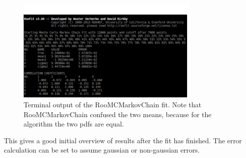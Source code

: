 \documentclass[english]{uzhpub}
\begin{document}
\begin{figure}[H]
  \centering
  \includegraphics[width=0.8\textwidth]{RooMCMC/terminal_output}
  \caption{Terminal output of the RooMCMarkovChain fit. Note that RooMCMarkovChain confused the two means, because for the algorithm the two pdfs are equal.}
  \label{fig:terminal}
\end{figure}
This gives a good initial overview of results after the fit has finished. The error calculation can be set to assume gaussian or non-gaussian errors.
\end{document}
